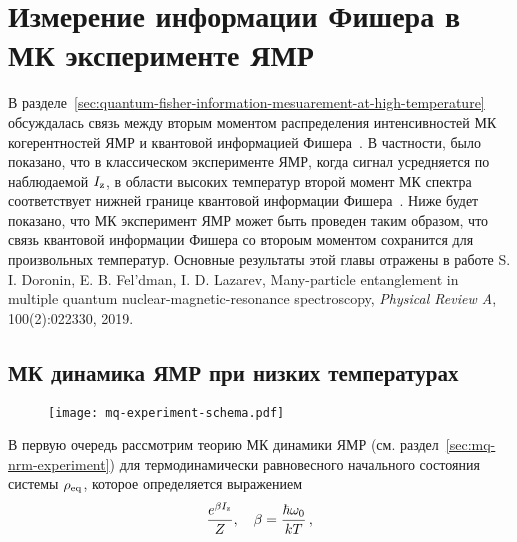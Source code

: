 \chapter{Измерение информации Фишера в МК эксперименте ЯМР}
\label{chapter:quantum-fisher-information-measurement}

В разделе~\ref{sec:quantum-fisher-information-mesuarement-at-high-temperature}
обсуждалась связь между вторым моментом распределения интенсивностей МК когерентностей ЯМР и квантовой информацией Фишера~\cite{Toth2014,Pezze2018}.
В частности, было показано,
что в классическом эксперименте ЯМР, когда сигнал усредняется по наблюдаемой $I_\mathrm{z}$, в области высоких температур второй момент МК спектра соответствует нижней границе квантовой информации Фишера~\cite{Garttner2018}.
Ниже будет показано, что МК эксперимент ЯМР может быть проведен таким образом,
что связь квантовой информации Фишера со второым моментом сохранится для произвольных температур. 
Основные результаты этой главы отражены в работе 
S. I. Doronin, E. B. Fel'dman,  I. D. Lazarev, Many-particle entanglement in multiple quantum nuclear-magnetic-resonance spectroscopy, \textit{Physical Review A}, 100(2):022330, 2019. 


\section{МК динамика ЯМР при низких температурах}
\begin{figure}[H]
  \centering
  \texttt{[image: mq-experiment-schema.pdf]}
  \caption{\protect}
  \label{fig:mq-experiment-schema}
\end{figure}

В первую очередь рассмотрим теорию МК динамики ЯМР (см. раздел~\ref{sec:mq-nrm-experiment})
для термодинамически равновесного начального состояния системы $\rho_\mathrm{eq}$,
которое определяется выражением
%
\begin{equation}\label{eq:rho_eq}
  \dfrac{e^{\beta I_\mathrm{z}}}{Z}, \quad \beta = \frac{\hbar\omega_{0}}{kT} \, ,
\end{equation}
%
\rhoEqExplanatoryNote

